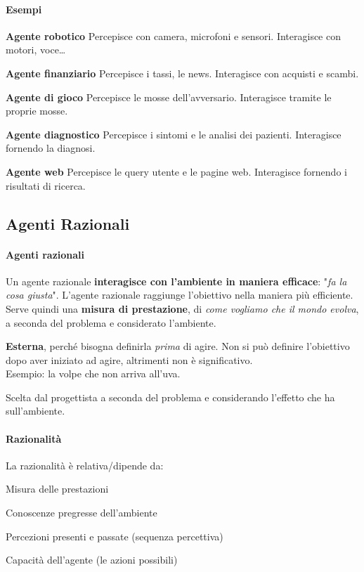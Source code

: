 \documentclass[10pt]{book}
\begin{document}
\paragraph{Esempi}
\begin{list}{}{}
	\item \textbf{Agente robotico} Percepisce con camera, microfoni e sensori. Interagisce con motori, voce\ldots
	\item \textbf{Agente finanziario} Percepisce i tassi, le news. Interagisce con acquisti e scambi.
	\item \textbf{Agente di gioco} Percepisce le mosse dell'avversario. Interagisce tramite le proprie mosse.
	\item \textbf{Agente diagnostico} Percepisce i sintomi e le analisi dei pazienti. Interagisce fornendo la diagnosi.
	\item \textbf{Agente web} Percepisce le query utente e le pagine web. Interagisce fornendo i risultati di ricerca.
\end{list}
\subsection{Agenti Razionali}
\paragraph{Agenti razionali} Un agente razionale \textbf{interagisce con l'ambiente in maniera efficace}: "\textit{fa la cosa giusta}". L'agente razionale raggiunge l'obiettivo nella maniera più efficiente.\\
Serve quindi una \textbf{misura di prestazione}, di \textit{come vogliamo che il mondo evolva}, a seconda del problema e considerato l'ambiente.
\begin{list}{}{}
	\item \textbf{Esterna}, perché bisogna definirla \textit{prima} di agire. Non si può definire l'obiettivo dopo aver iniziato ad agire, altrimenti non è significativo.\\
	Esempio: la volpe che non arriva all'uva.
	\item Scelta dal progettista a seconda del problema e considerando l'effetto che ha sull'ambiente.
\end{list}
\paragraph{Razionalità} La razionalità è relativa/dipende da:
\begin{list}{}{}
	\item Misura delle prestazioni
	\item Conoscenze pregresse dell'ambiente
	\item Percezioni presenti e passate (sequenza percettiva)
	\item Capacità dell'agente (le azioni possibili)
\end{list}
\end{document}
